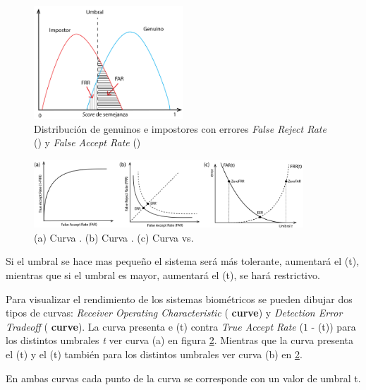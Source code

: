 \begin{figure}[t]
    \centering
    \includegraphics[width=0.5\textwidth]{ch-sistemasABC/images/ch-sistemasBiometricos/curves_DistribucionGenuinoImpostor-01.png}
    \caption{Distribución de genuinos e impostores con errores \textit{False Reject Rate} () y \textit{False Accept Rate} ()}
    \label{fig:distribucionesGenuinoImpostor}
\end{figure}

\begin{figure}[t]
    \centering
    \includegraphics[width=0.9\textwidth]{ch-sistemasABC/images/ch-sistemasBiometricos/curves_ROC_DET_FARvsFRR-01.png}
    \caption{(a) Curva . (b) Curva . (c) Curva vs.}
    \label{fig:tiposCurvas}
\end{figure}

Si el umbral se hace mas pequeño el sistema será más tolerante, aumentará el (t), mientras que si el umbral es mayor, aumentará el (t), se hará restrictivo.

Para visualizar el rendimiento de los sistemas biométricos se pueden dibujar dos tipos de curvas: \textit{Receiver Operating Characteristic} (\textbf{ curve}) y \textit{Detection Error Tradeoff} (\textbf{ curve}). La curva  presenta e (t) contra \textit{True Accept Rate} ($1$ - (t)) para los distintos umbrales \textit{t} ver curva (a) en figura \ref{fig:tiposCurvas}. Mientras que la curva  presenta el (t) y el (t) también para los distintos umbrales ver curva (b) en \ref{fig:tiposCurvas}. 

En ambas curvas cada punto de la curva se corresponde con un valor de umbral t.

